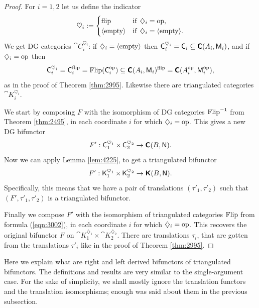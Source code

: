 \begin{proof}
For $i = 1, 2$ let us define the indicator 
\[ \heartsuit_i :=
\begin{cases}
\mathrm{flip} & \textup{if} \hspace{1ex} \diamondsuit_i = \mathrm{op}, 
\\
\langle \mathrm{empty} \rangle & \textup{if} \hspace{1ex} \diamondsuit_i =  \langle \mathrm{empty} \rangle .
\end{cases} \]
We get DG categories $\cat{C}_i^{\heartsuit_i}$: 
if $\diamondsuit_i =  \langle \mathrm{empty} \rangle$ then
$\operatorname{\mathsf{C}}_i^{\heartsuit_i} = \operatorname{\mathsf{C}}_i \subseteq \boldsymbol{\mathsf{C}}(A_i, \operatorname{\mathsf{M}}_i)$,
and if $\diamondsuit_i = \mathrm{op}$ then 
\[ \operatorname{\mathsf{C}}_i^{\heartsuit_i} = \operatorname{\mathsf{C}}_i^{\mathrm{flip}} 
= \operatorname{Flip}(\operatorname{\mathsf{C}}_i^{\mathrm{op}}) \subseteq 
\boldsymbol{\mathsf{C}}(A_i, \operatorname{\mathsf{M}}_i)^{\mathrm{flip}} = 
\boldsymbol{\mathsf{C}}(A_i^{\mathrm{op}}, \operatorname{\mathsf{M}}_i^{\mathrm{op}}) , \]
as in the proof of Theorem \ref{thm:2995}. Likewise there are triangulated 
categories $\cat{K}_i^{\heartsuit_i}$. 

We start by composing $F$ with the isomorphism of DG categories 
$\operatorname{Flip}^{-1}$ from Theorem \ref{thm:2495}, in each coordinate $i$ for which 
$\diamondsuit_i = \operatorname{op}$. This gives a new DG bifunctor 
\[ F' : \operatorname{\mathsf{C}}_1^{\heartsuit_1} \times \operatorname{\mathsf{C}}_2^{\heartsuit_2} \to
\boldsymbol{\mathsf{C}}(B, \operatorname{\mathsf{N}}) . \]
Now we can apply Lemma \ref{lem:4225}, to get a triangulated bifunctor 
\[ F' : \operatorname{\mathsf{K}}_1^{\heartsuit_1} \times \operatorname{\mathsf{K}}_2^{\heartsuit_2} \to
\boldsymbol{\mathsf{K}}(B, \operatorname{\mathsf{N}}) . \]
Specifically, this means that we have a pair of translations 
$(\tau'_1, \tau'_2)$ such that \lb $(F', \tau'_1, \tau'_2)$ is 
a triangulated bifunctor. 

Finally we compose $F'$ with the isomorphism of triangulated categories 
$\operatorname{Flip}$ from formula (\ref{eqn:3002}), in each coordinate $i$ for which 
$\diamondsuit_i = \operatorname{op}$. This recovers the original bifunctor $F$ on
$\cat{K}_1^{\diamondsuit_1} \times \cat{K}_2^{\diamondsuit_2}$.
There are translations $\tau_i$, that are gotten from the 
translations $\tau'_i$ like in the proof of Theorem \ref{thm:2995}. 
\end{proof}



  \label{subsec:der-bifun}

Here we explain what are right and left derived bifunctors of triangulated 
bifunctors. The definitions and results are very similar to the single-argument 
case. For the sake of simplicity, we shall mostly ignore the translation 
functors and the translation isomorphisms; enough was said about them in the 
previous subsection. 

